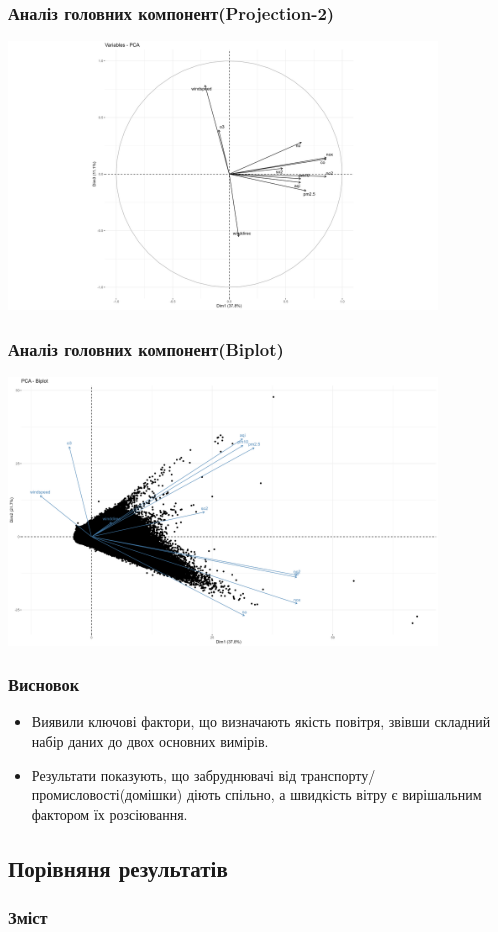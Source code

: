 \documentclass{beamer}
\begin{document}
\begin{frame}
\frametitle{Аналіз головних компонент(Projection-2)}
  \includegraphics[height=2.8in]{plots/lab4/pca/projection-1-3.png}
\end{frame}

\begin{frame}
\frametitle{Аналіз головних компонент(Biplot)}
  \includegraphics[height=2.8in]{plots/lab4/pca/biplot.png}
\end{frame}

\begin{frame}
  \frametitle{Висновок}
  \begin{itemize}
    \item Виявили ключові фактори, що визначають якість повітря,
     звівши складний набір даних до двох основних вимірів.
    \item Результати показують, що забруднювачі від транспорту/промисловості(домішки) діють спільно,
     а швидкість вітру є вирішальним фактором їх розсіювання.
  \end{itemize}
\end{frame}

\begin{frame}
  \section{Порівняня результатів}

  \frametitle{Зміст}
  \tableofcontents[currentsection]
\end{frame}
\end{document}
